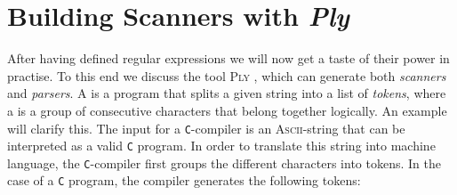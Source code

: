 \chapter{Building Scanners with \textsl{Ply}}
After having defined regular expressions we will now get a taste of their power in practise.
To this end we discuss the tool \textsc{Ply} , which can generate both 
\emph{scanners} and \emph{parsers}.
A    is a program that splits a given string into a list of \emph{tokens}, 
where a   is a group of consecutive characters that belong together logically.  An example
will clarify this.   
The input for a \texttt{C}-compiler is an \textsc{Ascii}-string that can be interpreted as a
valid \texttt{C} program.  In order to translate this string into machine language, the
\texttt{C}-compiler first groups the different characters into tokens.  In the case of a \texttt{C}
program, the compiler generates the following tokens:
